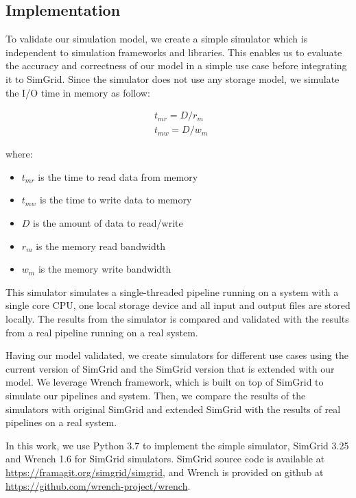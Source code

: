 \documentclass[conference]{IEEEtran}
\begin{document}
		\subsection{Implementation}

			To validate our simulation model, we create a simple 
			simulator which is independent to simulation frameworks and libraries. 
			This enables us to evaluate the accuracy and correctness of our 
			model in a simple use case before integrating it to SimGrid. 
			Since the simulator does not use any storage model, we simulate the 
			I/O time in memory as follow:
			
			\begin{align*}
				& t_{mr} = D / r_m \\ 
				& t_{mw} = D / w_m\
			\end{align*}		
			
			where:
			\begin{itemize}
				\item $t_{mr}$ is the time to read data from memory
				\item $t_{mw}$ is the time to write data to memory
				\item $D$ is the amount of data to read/write
				\item $r_m$ is the memory read bandwidth
				\item $w_m$ is the  memory write bandwidth
			\end{itemize}			
			
			This simulator simulates a single-threaded pipeline running on a system 
			with a single core CPU, one local storage device and all input and 
			output files are stored locally. The results from the simulator is compared 
			and validated with the results from a real pipeline running on
			a real system.
			
			Having our model validated, we create simulators for different use cases 
			using the current version of SimGrid and the SimGrid version that is 
			extended with our model. We leverage Wrench framework, which is 
			built on top of SimGrid to simulate our pipelines and system.
			Then, we compare the results of the simulators with
			original SimGrid and extended SimGrid with the results of real
			pipelines on a real system. 
		
			In this work, we use Python 3.7 to implement the simple
			simulator, SimGrid 3.25 and Wrench 1.6 for SimGrid simulators. 
			SimGrid source code is available at 
			\url{https://framagit.org/simgrid/simgrid}, and Wrench is provided on
			github at \url{https://github.com/wrench-project/wrench}.
			
\end{document}
